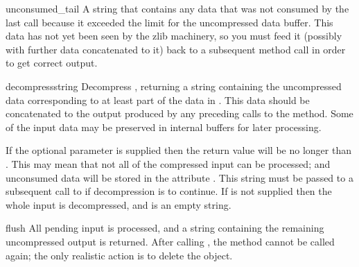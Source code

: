 \begin{memberdesc}{unconsumed_tail}
A string that contains any data that was not consumed by the last
 call because it exceeded the limit for the
uncompressed data buffer.  This data has not yet been seen by the zlib
machinery, so you must feed it (possibly with further data
concatenated to it) back to a subsequent  method
call in order to get correct output.
\end{memberdesc}


\begin{methoddesc}[Decompress]{decompress}{string}
Decompress , returning a string containing the
uncompressed data corresponding to at least part of the data in
.  This data should be concatenated to the output produced
by any preceding calls to the
 method.  Some of the input data may be preserved
in internal buffers for later processing.

If the optional parameter  is supplied then the return value
will be no longer than . This may mean that not all of the
compressed input can be processed; and unconsumed data will be stored
in the attribute . This string must be passed
to a subsequent call to  if decompression is to
continue.  If  is not supplied then the whole input is
decompressed, and  is an empty string.
\end{methoddesc}

\begin{methoddesc}[Decompress]{flush}{}
All pending input is processed, and a string containing the remaining
uncompressed output is returned.  After calling , the
 method cannot be called again; the only realistic
action is to delete the object.
\end{methoddesc}

\begin{seealso}
\end{seealso}
